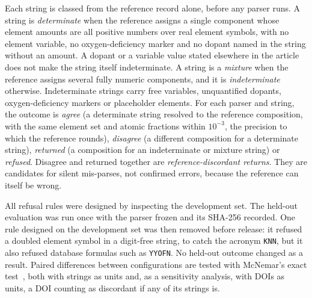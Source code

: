 \documentclass[10pt,journal]{IEEEtran}
\begin{document}
Each string is classed from the reference record alone, before any parser runs. A string is \emph{determinate} when the reference assigns a single component whose element amounts are all positive numbers over real element symbols, with no element variable, no oxygen-deficiency marker and no dopant named in the string without an amount. A dopant or a variable value stated elsewhere in the article does not make the string itself indeterminate. A string is a \emph{mixture} when the reference assigns several fully numeric components, and it is \emph{indeterminate} otherwise. Indeterminate strings carry free variables, unquantified dopants, oxygen-deficiency markers or placeholder elements. For each parser and string, the outcome is \emph{agree} (a determinate string resolved to the reference composition, with the same element set and atomic fractions within $10^{-3}$, the precision to which the reference rounds), \emph{disagree} (a different composition for a determinate string), \emph{returned} (a composition for an indeterminate or mixture string) or \emph{refused}. Disagree and returned together are \emph{reference-discordant returns}. They are candidates for silent mis-parses, not confirmed errors, because the reference can itself be wrong.

All refusal rules were designed by inspecting the development set. The held-out evaluation was run once with the parser frozen and its SHA-256 recorded. One rule designed on the development set was then removed before release: it refused a doubled element symbol in a digit-free string, to catch the acronym \texttt{KNN}, but it also refused \NRemovedRuleCorpus{} database formulas such as \texttt{YYOFN}. No held-out outcome changed as a result. Paired differences between configurations are tested with McNemar's exact test~\cite{mcnemar1947}, both with strings as units and, as a sensitivity analysis, with DOIs as units, a DOI counting as discordant if any of its strings is.
\end{document}
